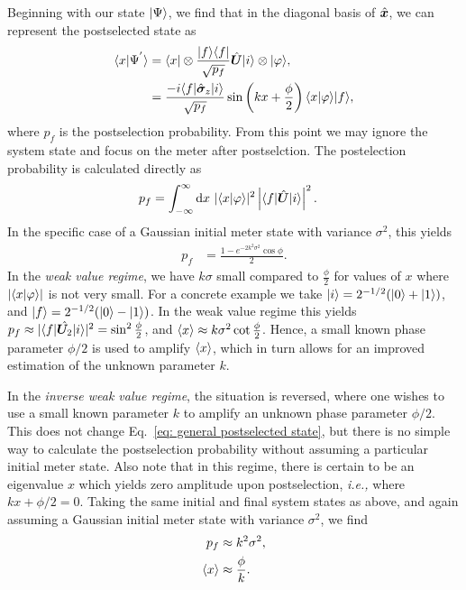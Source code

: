 Beginning with our state $\lvert \Psi\rangle$, we find that in the diagonal basis of $\hat{\bm x}$, we can represent the postselected state as 
\begin{align}\label{eq: general postselected state}
	\nonumber \langle x \vert \Psi^{'} \rangle &= \langle x \rvert \otimes \frac{\lvert f\rangle\langle f \rvert}{\sqrt{p_f}} \hat{\bm U} \lvert i\rangle \otimes \lvert \varphi\rangle, \\
	&= \frac{-i \langle f \rvert\hat{\bm \sigma}_z \lvert i\rangle}{\sqrt{p_f}} \sin \left(k x + \frac{\phi}{2}\right) \langle x \vert \varphi \rangle \lvert f\rangle,
\end{align}
where $p_f$ is the postselection probability.  From this point we may ignore the system state and focus on the meter after postselction.  The postelection probability is calculated directly as 
\begin{align}
	p_f &= \int_{-\infty}^{\infty} \text{d}x~ |\langle x \vert \varphi \rangle|^2 \left|\langle f \rvert\hat{\bm U} \lvert i\rangle\right|^2.
\end{align} 
In the specific case of a Gaussian initial meter state with variance $\sigma^2$, this yields 
\begin{align}\label{eq:postselection probability}
	p_f &= \frac{1 -  e^{-2k^2\sigma^2}\cos\phi}{2}.
\end{align}
In the \emph{weak value regime}, we have $k\sigma$ small compared to $\frac{\phi}{2}$ for values of $x$ where $|\langle x \vert \varphi \rangle|$ is not very small.  For a concrete example we take $\lvert i\rangle = 2^{-1/2}(\lvert 0\rangle + \lvert 1\rangle)$, and  $\lvert f\rangle = 2^{-1/2}(\lvert 0\rangle - \lvert 1\rangle)$.  In the weak value regime this yields $p_f \approx |\langle f \rvert\hat{\bm U_2}\lvert i\rangle|^2 =\sin^2 \frac{\phi}{2}$, and $\left\langle x \right\rangle \approx k \sigma^2 \cot \frac{\phi}{2}$.  Hence, a small known phase parameter $\phi/2$ is used to amplify $\left\langle x \right\rangle$, which in turn allows for an improved estimation of the unknown parameter $k$.

In the \emph{inverse weak value regime}, the situation is reversed, where one wishes to use a small known parameter $k$ to amplify an unknown phase parameter $\phi/{2}$.  This does not change Eq.~\eqref{eq: general postselected state}, but there is no simple way to calculate the postselection probability without assuming a particular initial meter state.  Also note that in this regime, there is certain to be an eigenvalue $x$ which yields zero amplitude upon postselection, \emph{i.e.,} where $k x + \phi/{2} = 0$.  Taking the same initial and final system states as above, and again assuming a Gaussian initial meter state with variance $\sigma^2$, we find 
\begin{align}\label{eq:noiseless iwv}
	\nonumber p_f &\approx k^2 \sigma^2, \\
	\left\langle x \right\rangle &\approx \frac{\phi}{k}.
\end{align}

